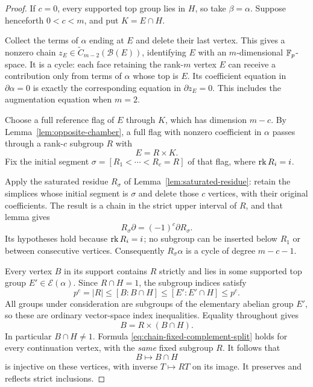 \begin{proof}
If $c=0$, every supported top group lies in $H$, so take
$\beta=\alpha$. Suppose henceforth $0<c<m$, and put
$K=E\cap H$.

Collect the terms of $\alpha$ ending at $E$ and delete their
last vertex. This gives a nonzero chain
$z_E\in\widetilde C_{m-2}(\mathcal B(E))$, identifying
$E$ with an $m$-dimensional $\mathbb F_p$-space. It is a cycle:
each face retaining the rank-$m$ vertex $E$ can receive a
contribution only from terms of $\alpha$ whose top is $E$.
Its coefficient equation in $\partial\alpha=0$ is exactly
the corresponding equation in $\partial z_E=0$. This includes
the augmentation equation when $m=2$.

Choose a full reference flag of $E$ through $K$, which has
dimension $m-c$. By Lemma~\ref{lem:opposite-chamber}, a full
flag with nonzero coefficient in $\alpha$ passes through a
rank-$c$ subgroup $R$ with
\begin{equation}\label{eq:chain-chosen-complement}
 E=R\times K.
\end{equation}
Fix the initial segment $\sigma=[R_1<\cdots<R_c=R]$ of
that flag, where $\operatorname{rk} R_i=i$.

Apply the saturated residue $R_\sigma$ of
Lemma~\ref{lem:saturated-residue}: retain the simplices whose
initial segment is $\sigma$ and delete those $c$ vertices,
with their original coefficients. The result is a chain in
the strict upper interval of $R$, and that lemma gives
\begin{equation}\label{eq:chain-restriction-residue}
 R_\sigma\partial=(-1)^c\partial R_\sigma.
\end{equation}
Its hypotheses hold because $\operatorname{rk} R_i=i$; no subgroup can
be inserted below $R_1$ or between consecutive vertices.
Consequently $R_\sigma\alpha$ is a cycle of degree $m-c-1$.

Every vertex $B$ in its support contains $R$ strictly and
lies in some supported top group $E'\in\mathcal E(\alpha)$.
Since $R\cap H=1$, the subgroup indices satisfy
\begin{equation}\label{eq:chain-index-sandwich}
 p^c=|R|\leq[B:B\cap H]
      \leq[E':E'\cap H]\leq p^c.
\end{equation}
All groups under consideration are subgroups of the
elementary abelian group $E'$, so these are ordinary
vector-space index inequalities. Equality throughout gives
\begin{equation}\label{eq:chain-fixed-complement-split}
 B=R\times(B\cap H).
\end{equation}
In particular $B\cap H\ne1$. Formula
\eqref{eq:chain-fixed-complement-split} holds for every
continuation vertex, with the \emph{same} fixed subgroup $R$.
It follows that
\[
 B\longmapsto B\cap H
\]
is injective on these vertices, with inverse $T\mapsto RT$
on its image. It preserves and reflects strict inclusions.


\end{proof}
